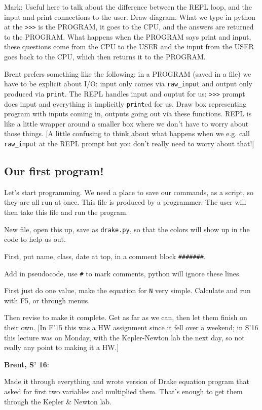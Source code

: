 \documentclass{article}
\newenvironment{reflect}[1]
{
  \begin{lrbox}{\reflectbox}
    \begin{minipage}[t]{\textwidth}
      \textbf{#1}:
}{
    \end{minipage}
  \end{lrbox}
  \fbox{\usebox{\reflectbox}}
}
\begin{document}
Mark: Useful here to talk about the difference between the REPL loop,
and the input and print connections to the user. Draw diagram. What we
type in python at the \verb|>>>| is the PROGRAM, it goes to the CPU,
and the answers are returned to the PROGRAM. What happens when the
PROGRAM says print and input, these questions come from the CPU to the
USER and the input from the USER goes back to the CPU, which then
returns it to the PROGRAM.

Brent prefers something like the following: in a PROGRAM (saved in a
file) we have to be explicit about I/O: input only comes via
\verb|raw_input| and output only produced via \verb|print|.  The REPL
handles input and ouptut for us: \verb|>>>| prompt does input and
everything is implicitly \verb|print|ed for us.  Draw box representing
program with inputs coming in, outputs going out via these functions.
REPL is like a little wrapper around a smaller box where we don't have
to worry about those things.  [A little confusing to think about what
happens when we e.g. call \verb|raw_input| at the REPL prompt but you
don't really need to worry about that!]

\subsection*{Our first program!}

Let's start programming.  We need a place to save our commands, as a
script, so they are all run at once.  This file is produced by a
programmer.  The user will then take this file and run the program.

New file, open this up, save as \verb|drake.py|, so that the colors
will show up in the code to help us out.

First, put name, class, date at top, in a comment block \verb|#######|.

Add in pseudocode, use \verb|#| to mark comments, python will ignore
these lines.

First just do one value, make the equation for \verb|N| very simple.
Calculate and run with F5, or through menus.

Then revise to make it complete.  Get as far as we can, then let them
finish on their own. [In F'15 this was a HW assignment since it
fell over a weekend; in S'16 this lecture was on Monday, with the
Kepler-Newton lab the next day, so not really any point to making it a HW.]

\begin{reflect}{Brent, S' 16}
  Made it through everything and wrote version of Drake equation
  program that asked for first two variables and multiplied them.
  That's enough to get them through the Kepler \& Newton lab.
\end{reflect}
\end{document}
